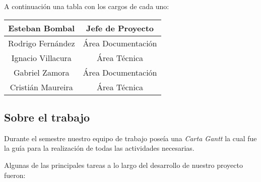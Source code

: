 A continuación una tabla con los cargos de cada uno:

\begin{center}
	\begin{tabular}{|c|c|}
		\hline
		Esteban Bombal    & Jefe de Proyecto \\\hline
		Rodrigo Fernández & Área Documentación \\\hline
		Ignacio Villacura & Área Técnica \\\hline
		Gabriel Zamora    & Área Documentación \\\hline
		Cristián Maureira & Área Técnica \\\hline
	\end{tabular}
\end{center}

\subsection{Sobre el trabajo}

Durante el semestre nuestro equipo de trabajo poseía una \emph{Carta Gantt} la cual fue la guía
para la realización de todas las actividades necesarias.

Algunas de las principales tareas a lo largo del desarrollo de nuestro proyecto fueron:

